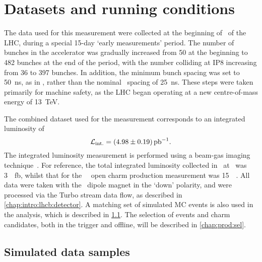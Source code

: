 \chapter{Datasets and running conditions}
\label{chap:prod:data}

The data used for this measurement were collected at the beginning of \runtwo\ 
of the \ac{LHC}, during a special 15-day `early measurements' period.
The number of bunches in the accelerator was gradually increased from 50 at the 
beginning to 482 bunches at the end of the period, with the number colliding at 
IP8 increasing from 36 to 397 bunches.
In addition, the minimum bunch spacing was set to \SI{50}{\nano\second}, as in 
\runone, rather than the nominal \runtwo\ spacing of \SI{25}{\nano\second}.
These steps were taken primarily for machine safety, as the \ac{LHC} began 
operating at a new centre-of-mass energy of \SI{13}{\TeV}.

The combined dataset used for the measurement corresponds to an integrated 
luminosity of
\begin{equation}
  \intlumi = \SI{\xsectotlumi}{\per\pico\barn}.
  \label{eqn:prod:xsectotlumi}
\end{equation}
The integrated luminosity measurement is performed using a beam-gas imaging 
technique~\cite{LHCb-PAPER-2014-047}.
For reference, the total integrated luminosity collected in \runone\ at \lhcb\ 
was \SI{3}{\per\femto\barn}, whilst that for the \ \lhcb\ open charm 
production measurement was \SI{15}{\per\nb}.
All data were taken with the \lhcb\ dipole magnet in the `down' polarity, and 
were processed via the Turbo stream data flow, as described in 
\cref{chap:intro:lhcb:detector}.
A matching set of simulated \ac{MC} events is also used in the analysis, which 
is described in \cref{chap:prod:data:mc}.
The selection of events and charm candidates, both in the trigger and offline, 
will be described in \cref{chap:prod:sel}.

\section{Simulated data samples}
\label{chap:prod:data:mc}

